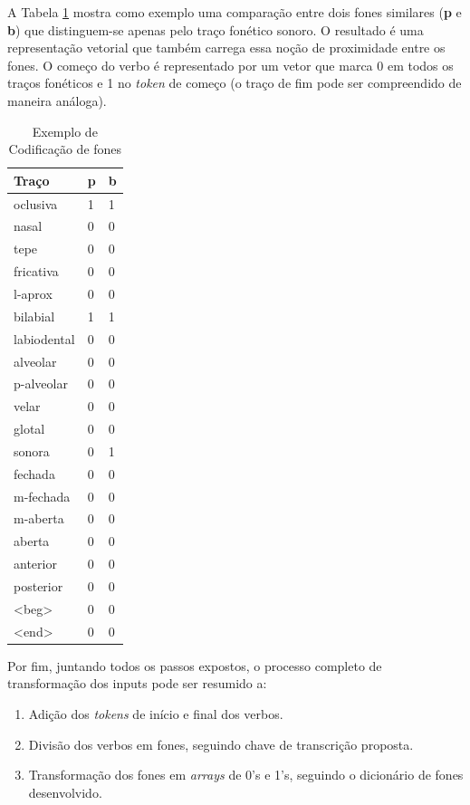 A Tabela \ref{tab:coding_example} mostra como exemplo uma comparação entre dois fones similares (\textbf{p} e \textbf{b}) que distinguem-se apenas pelo traço fonético sonoro. O resultado é uma representação vetorial que também carrega essa noção de proximidade entre os fones. O começo do verbo é representado por um vetor que marca 0 em todos os traços fonéticos e 1 no \textit{token} de começo (o traço de fim pode ser compreendido de maneira análoga). 

\begin{table}[H]
\begin{center}
\begin{tabular}{lll}
\textbf{ Traço} & \textbf{p} &\textbf{ b} \\
 \toprule
oclusiva & 1 & 1 \\
nasal & 0 & 0 \\
tepe & 0 & 0 \\
fricativa & 0 & 0 \\
l-aprox & 0 & 0 \\
bilabial & 1 & 1 \\
labiodental & 0 & 0 \\
alveolar & 0 & 0 \\
p-alveolar & 0 & 0 \\
velar & 0 & 0 \\
glotal & 0 & 0 \\
sonora & 0 & 1 \\
fechada & 0 & 0 \\
m-fechada & 0 & 0 \\
m-aberta & 0 & 0 \\
aberta & 0 & 0 \\
anterior & 0 & 0 \\
posterior & 0 & 0 \\
<beg> & 0 & 0 \\
<end> & 0 & 0
\end{tabular}
\end{center}
\caption{Exemplo de Codificação de fones}
\label{tab:coding_example}
\end{table}

Por fim, juntando todos os passos expostos, o processo completo de transformação dos inputs pode ser resumido a:

\begin{enumerate}
    \item Adição dos \textit{tokens} de início e final dos verbos.
    \item Divisão dos verbos em fones, seguindo chave de transcrição proposta.
    \item Transformação dos fones em \textit{arrays} de 0's e 1's, seguindo o dicionário de fones desenvolvido.
\end{enumerate}







